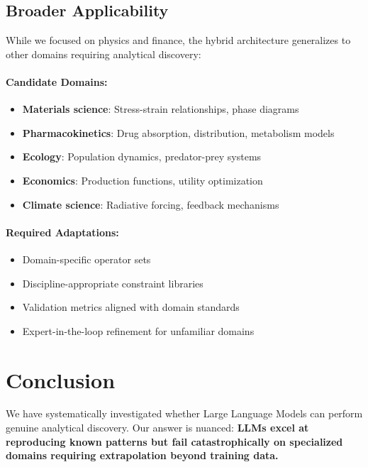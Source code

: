 \documentclass[twoside,11pt]{article}
\begin{document}
\subsection{Broader Applicability}

While we focused on physics and finance, the hybrid architecture generalizes to other domains requiring analytical discovery:

\paragraph{Candidate Domains:}
\begin{itemize}
\item \textbf{Materials science}: Stress-strain relationships, phase diagrams
\item \textbf{Pharmacokinetics}: Drug absorption, distribution, metabolism models
\item \textbf{Ecology}: Population dynamics, predator-prey systems
\item \textbf{Economics}: Production functions, utility optimization
\item \textbf{Climate science}: Radiative forcing, feedback mechanisms
\end{itemize}

\paragraph{Required Adaptations:}
\begin{itemize}
\item Domain-specific operator sets
\item Discipline-appropriate constraint libraries
\item Validation metrics aligned with domain standards
\item Expert-in-the-loop refinement for unfamiliar domains
\end{itemize}


\section{Conclusion}

We have systematically investigated whether Large Language Models can perform genuine analytical discovery. Our answer is nuanced: \textbf{LLMs excel at reproducing known patterns but fail catastrophically on specialized domains requiring extrapolation beyond training data.}
\end{document}
